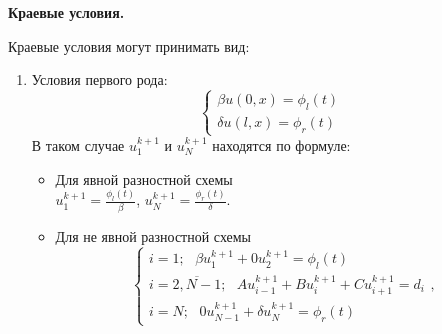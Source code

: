 \documentclass[12pt]{article}
\begin{document}
\begin{enumerate}
    \begin{center}  \textbf{Краевые условия.} \end{center}
    Краевые условия могут принимать вид:
    \begin{enumerate}
        \item Условия первого рода:
            \begin{equation*}
                \begin{cases}
                    \beta u(0,x) = \phi_l(t)
                    \\
                    \delta u(l,x) = \phi_r(t)
                \end{cases}
            \end{equation*}
            В таком случае $u_1^{k+1}$ и $u_N^{k+1}$ находятся по формуле:
            \begin{itemize}
                \item Для явной разностной схемы\\
                $u_1^{k+1}=\frac{\phi_l(t)}{\beta}$, $u_N^{k+1}=\frac{\phi_r(t)}{\delta}$.
                \item Для не явной разностной схемы\\
                \begin{equation*}
                    \begin{cases}
                        i=1;\:\:\: \beta u_1^{k+1} +0u_{2}^{k+1}=\phi_l(t)
                        \\
                        i=\overline{2,N-1};\:\:\:Au_{i-1}^{k+1} + Bu_i^{k+1} +Cu_{i+1}^{k+1}=d_i
                        \\
                        i=N;\:\:\: 0u_{N-1}^{k+1} + \delta u_N^{k+1} = \phi_r(t)
                    \end{cases},
                \end{equation*}
            \end{itemize}


\end{enumerate}
\end{enumerate}
\end{document}

